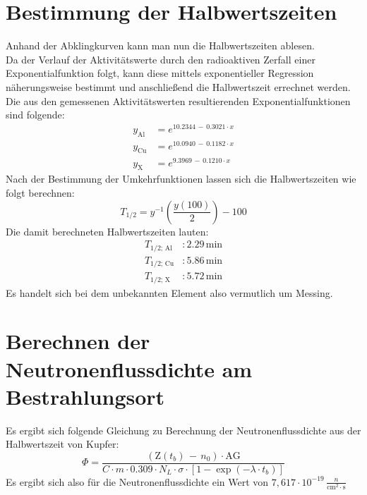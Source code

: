 \documentclass[12pt,german]{article}
\begin{document}
    \section{Bestimmung der Halbwertszeiten}
    \noindent
    Anhand der Abklingkurven kann man nun die Halbwertszeiten ablesen. \\
    Da der Verlauf der Aktivitätswerte durch den radioaktiven Zerfall einer Exponentialfunktion folgt, kann diese mittels exponentieller Regression näherungsweise bestimmt und anschließend die Halbwertszeit errechnet werden.
    Die aus den gemessenen Aktivitätswerten resultierenden Exponentialfunktionen sind folgende:
    \begin{align*}
        y_\text{Al} &= e^{10.2344\, -\, 0.3021 \cdot x} \\
        y_\text{Cu} &= e^{10.0940\, - \, 0.1182 \cdot x} \\
        y_\text{X} &= e^{9.3969\, -\, 0.1210 \cdot x}
    \end{align*}
    Nach der Bestimmung der Umkehrfunktionen lassen sich die Halbwertszeiten wie folgt berechnen:
    \begin{equation*}
        T_{1/2} = y^{-1}\left(\frac{y(100)}{2}\right) - 100
    \end{equation*}
    Die damit berechneten Halbwertszeiten lauten:
    \begin{align*}
        T_{1/2;\, \text{Al}}&: 2.29\, \text{min} \\
        T_{1/2;\, \text{Cu}}&: 5.86\, \text{min} \\
        T_{1/2;\, \text{X}}&: 5.72\, \text{min}
    \end{align*}
    Es handelt sich bei dem unbekannten Element also vermutlich um Messing.

    \section{Berechnen der Neutronenflussdichte am Bestrahlungsort}
    Es ergibt sich folgende Gleichung zu Berechnung der Neutronenflussdichte aus der Halbwertszeit von Kupfer:
    \begin{equation*}
        \Phi = \frac{\left(\text{Z}(t_b)\, -\, n_0\right) \cdot \text{AG}}{C \cdot m \cdot 0.309 \cdot N_L \cdot \sigma \cdot \left[1 - \exp(-\lambda \cdot t_b)\right]}
    \end{equation*}
    Es ergibt sich also für die Neutronenflussdichte ein Wert von $7,617 \cdot 10^{-19}\, \frac{n}{\text{cm}^2 \cdot \text{s}}$
\end{document}
